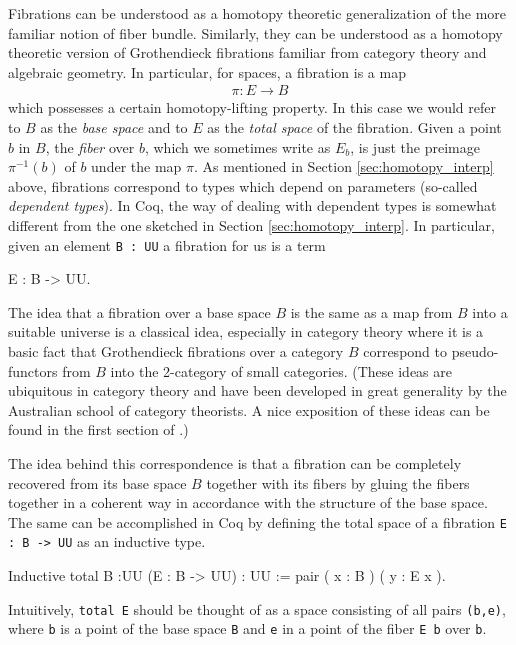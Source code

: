 Fibrations can be understood as a homotopy theoretic generalization of
the more familiar notion of fiber bundle.  Similarly, they can be
understood as a homotopy theoretic version of Grothendieck fibrations
familiar from category theory and algebraic geometry.  In particular,
for spaces, a fibration is a map
\begin{align*}
\pi \colon E \to B
\end{align*}
which possesses a certain homotopy-lifting property.  In this case we
would refer to $B$ as the \emph{base space} and to $E$ as the
\emph{total space} of the fibration.  Given a point $b$ in $B$, the
\emph{fiber} over $b$, which we sometimes write as $E_{b}$, is just the preimage $\pi^{-1}(b)$ of $b$ under
the map $\pi$.  As mentioned in Section \ref{sec:homotopy_interp}
above, fibrations correspond to
types which depend on parameters (so-called \emph{dependent types}).
In Coq, the way of dealing with dependent types is somewhat different
from the one sketched in Section \ref{sec:homotopy_interp}.  In
particular, given an element \verb|B : UU| a fibration for us is
a term
\begin{center}
  \begin{coqcode}
E : B -> UU.
  \end{coqcode}
\end{center}
The idea that a fibration over a base space $B$ is the same as a map
from $B$ into a suitable universe is a classical idea, especially in
category theory where it is a basic fact that Grothendieck fibrations
over a category $B$ correspond to pseudo-functors from $B$ into the
2-category of small categories.  (These ideas are ubiquitous in
category theory and have been developed in great generality by the
Australian school of category theorists.  A nice exposition of these
ideas can be found in the first section of \cite{Street:1980da}.)

The idea behind this correspondence is that a fibration can be completely recovered from its base space
$B$ together with its fibers by gluing the fibers together in a
coherent way in accordance with the structure of the base space.  The
same can be accomplished in Coq by defining the total space of a
fibration \verb|E : B -> UU| as an inductive type.
\begin{center}
  \begin{coqcode}
Inductive total {B :UU} (E : B -> UU) : UU := 
pair ( x : B ) ( y : E x ).
  \end{coqcode}
\end{center}
Intuitively, \verb|total E| should be thought of as a space consisting of all
pairs \verb|(b,e)|, where \verb|b| is a point of the base
space \verb|B| and \verb|e| in a point of the fiber
\verb|E b| over \verb|b|.

